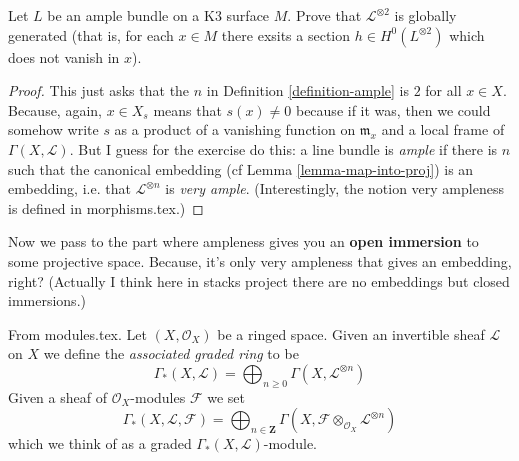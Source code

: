 \documentclass{book}
\begin{document}
\begin{exercise}
\label{exercise-ample-bundle-on-K3}
Let $L$ be an ample bundle on a K3 surface
$M$. Prove that
$\mathcal{L}^{\otimes 2}$ is globally
generated (that is, for each $x\in M$
there exsits a section $h \in
H^{0}(L^{\otimes 2})$ which does not vanish
in
$x$).
\end{exercise}

\begin{proof}
This just asks that the $n$ in Definition
\ref{definition-ample} is $2$ for all
$x\in X$. Because, again, $x\in X_s$ means
that $s(x)\neq 0$ because if it was,
then we could somehow write $s$ as a product
of a vanishing function on
$\mathfrak{m}_x$ and a local frame of
$\Gamma(X,\mathcal{L})$. But I guess for
the exercise do this: a line bundle is {\it
ample} if there is $n$ such that the
canonical embedding (cf Lemma
\ref{lemma-map-into-proj}) is an embedding,
i.e.
that $\mathcal{L}^{\otimes n}$ is {\it very
ample}. (Interestingly, the notion
very ampleness is defined in morphisms.tex.)
\end{proof}

Now we pass to the part where ampleness gives
you an {\bf open immersion} to
some projective space. Because, it's only
very ampleness that gives an
embedding, right? (Actually I think here in
stacks project there are no
embeddings but closed immersions.)

\begin{definition}
\label{definition-gamma-star}
From modules.tex. Let $(X, \mathcal{O}_X)$ be
a ringed space.
Given an invertible sheaf $\mathcal{L}$ on
$X$ we define
the {\it associated graded ring} to be
$$
\Gamma_*(X, \mathcal{L})
=
\bigoplus\nolimits_{n \geq 0} \Gamma(X,
\mathcal{L}^{\otimes n})
$$
Given a sheaf of $\mathcal{O}_X$-modules
$\mathcal{F}$ we set
$$
\Gamma_*(X, \mathcal{L}, \mathcal{F})
=
\bigoplus\nolimits_{n \in \mathbf{Z}}
\Gamma(X,
\mathcal{F} \otimes_{\mathcal{O}_X}
\mathcal{L}^{\otimes n})
$$
which we think of as a graded $\Gamma_*(X,
\mathcal{L})$-module.
\end{definition}
\end{document}
